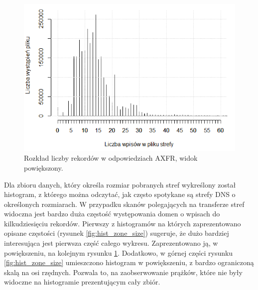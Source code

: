 \begin{figure}[h]
\centering
\includegraphics[width=1.0\textwidth]{image/hist_zone_size_zoom_no_title}
\caption{Rozkład liczby rekordów w odpowiedziach AXFR, widok powiększony.}
\label{fig:hist_zone_size_zoom}
\end{figure}

Dla zbioru danych, który określa rozmiar pobranych stref wykreślony został histogram, z którego można odczytać, jak często spotykane
są strefy DNS o określonych rozmiarach. W przypadku skanów polegających na transferze stref widoczna jest bardzo duża częstość
występowania domen o wpisach do kilkudziesięciu rekordów. Pierwszy z histogramów na których zaprezentowano opisane częstości
(rysunek \ref{fig:hist_zone_size}) sugeruje, że dużo bardziej interesująca jest pierwsza część całego wykresu. Zaprezentowano ją,
w powiększeniu, na kolejnym rysunku \ref{fig:hist_zone_size_zoom}. Dodatkowo, w górnej części rysunku \ref{fig:hist_zone_size}
umieszczono histogram w powiększeniu, z bardzo ograniczoną skalą na osi rzędnych. Pozwala to, na zaobserwowanie prążków, które
nie były widoczne na histogramie prezentującym cały zbiór.

